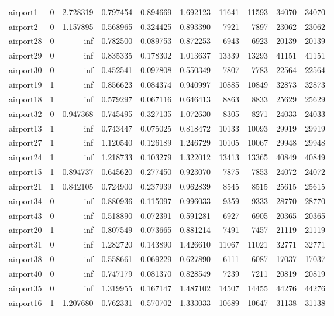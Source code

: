 \begin{longtable}{|l|r|r|r|r|r|r|r|r|r|}
airport1 & 0 & 2.728319 & 0.797454 & 0.894669 & 1.692123 & 11641 & 11593 & 34070 & 34070 \\
airport2 & 0 & 1.157895 & 0.568965 & 0.324425 & 0.893390 & 7921 & 7897 & 23062 & 23062 \\
airport28 & 0 & inf & 0.782500 & 0.089753 & 0.872253 & 6943 & 6923 & 20139 & 20139 \\
airport29 & 0 & inf & 0.835335 & 0.178302 & 1.013637 & 13339 & 13293 & 41151 & 41151 \\
airport30 & 0 & inf & 0.452541 & 0.097808 & 0.550349 & 7807 & 7783 & 22564 & 22564 \\
airport19 & 1 & inf & 0.856623 & 0.084374 & 0.940997 & 10885 & 10849 & 32873 & 32873 \\
airport18 & 1 & inf & 0.579297 & 0.067116 & 0.646413 & 8863 & 8833 & 25629 & 25629 \\
airport32 & 0 & 0.947368 & 0.745495 & 0.327135 & 1.072630 & 8305 & 8271 & 24033 & 24033 \\
airport13 & 1 & inf & 0.743447 & 0.075025 & 0.818472 & 10133 & 10093 & 29919 & 29919 \\
airport27 & 1 & inf & 1.120540 & 0.126189 & 1.246729 & 10105 & 10067 & 29948 & 29948 \\
airport24 & 1 & inf & 1.218733 & 0.103279 & 1.322012 & 13413 & 13365 & 40849 & 40849 \\
airport15 & 1 & 0.894737 & 0.645620 & 0.277450 & 0.923070 & 7875 & 7853 & 24072 & 24072 \\
airport21 & 1 & 0.842105 & 0.724900 & 0.237939 & 0.962839 & 8545 & 8515 & 25615 & 25615 \\
airport34 & 0 & inf & 0.880936 & 0.115097 & 0.996033 & 9359 & 9333 & 28770 & 28770 \\
airport43 & 0 & inf & 0.518890 & 0.072391 & 0.591281 & 6927 & 6905 & 20365 & 20365 \\
airport20 & 1 & inf & 0.807549 & 0.073665 & 0.881214 & 7491 & 7457 & 21119 & 21119 \\
airport31 & 0 & inf & 1.282720 & 0.143890 & 1.426610 & 11067 & 11021 & 32771 & 32771 \\
airport38 & 0 & inf & 0.558661 & 0.069229 & 0.627890 & 6111 & 6087 & 17037 & 17037 \\
airport40 & 0 & inf & 0.747179 & 0.081370 & 0.828549 & 7239 & 7211 & 20819 & 20819 \\
airport35 & 0 & inf & 1.319955 & 0.167147 & 1.487102 & 14507 & 14455 & 44276 & 44276 \\
airport16 & 1 & 1.207680 & 0.762331 & 0.570702 & 1.333033 & 10689 & 10647 & 31138 & 31138 \\

\end{longtable}
